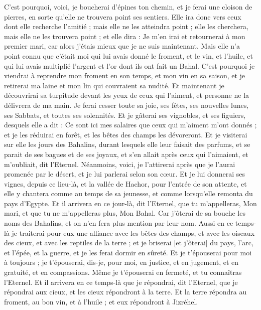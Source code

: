 \begin{multicols}{2}
C'est pourquoi, voici, je boucherai d'épines ton chemin, et je ferai une cloison de pierres, en sorte qu'elle ne trouvera point ses sentiers.
Elle ira donc vers ceux dont elle recherche l'amitié ; mais elle ne les atteindra point ; elle les cherchera, mais elle ne les trouvera point ; et elle dira : Je m'en irai et retournerai à mon premier mari, car alors j'étais mieux que je ne suis maintenant.
Mais elle n'a point connu que c'était moi qui lui avais donné le froment, et le vin, et l'huile, et qui lui avais multiplié l'argent et l'or dont ils ont fait un Bahal.
C'est pourquoi je viendrai à reprendre mon froment en son temps, et mon vin en sa saison, et je retirerai ma laine et mon lin qui couvraient sa nudité.
Et maintenant je découvrirai sa turpitude devant les yeux de ceux qui l'aiment, et personne ne la délivrera de ma main.
Je ferai cesser toute sa joie, ses fêtes, ses nouvelles lunes, ses Sabbats, et toutes ses solennités.
Et je gâterai ses vignobles, et ses figuiers, desquels elle a dit : Ce sont ici mes salaires que ceux qui m'aiment m'ont donnés ; et je les réduirai en forêt, et les bêtes des champs les dévoreront.
Et je visiterai sur elle les jours des Bahalins, durant lesquels elle leur faisait des parfums, et se parait de ses bagues et de ses joyaux, et s'en allait après ceux qui l'aimaient, et m'oubliait, dit l'Eternel.
Néanmoins, voici, je l'attirerai après que je l'aurai promenée par le désert, et je lui parlerai selon son cœur.
Et je lui donnerai ses vignes, depuis ce lieu-là, et la vallée de Hachor, pour l'entrée de son attente, et elle y chantera comme au temps de sa jeunesse, et comme lorsqu'elle remonta du pays d'Egypte.
Et il arrivera en ce jour-là, dit l'Eternel, que tu m'appelleras, Mon mari, et que tu ne m'appelleras plus, Mon Bahal.
Car j'ôterai de sa bouche les noms des Bahalins, et on n'en fera plus mention par leur nom.
Aussi en ce temps-là je traiterai pour eux une alliance avec les bêtes des champs, et avec les oiseaux des cieux, et avec les reptiles de la terre ; et je briserai [et j'ôterai] du pays, l'arc, et l'épée, et la guerre, et je les ferai dormir en sûreté.
Et je t'épouserai pour moi à toujours ; je t'épouserai, dis-je, pour moi, en justice, et en jugement, et en gratuité, et en compassions.
Même je t'épouserai en fermeté, et tu connaîtras l'Eternel.
Et il arrivera en ce temps-là que je répondrai, dit l'Eternel, que je répondrai aux cieux, et les cieux répondront à la terre.
Et la terre répondra au froment, au bon vin, et à l'huile ; et eux répondront à Jizréhel.

\end{multicols}
